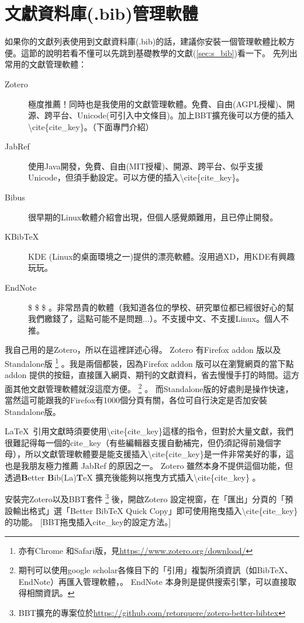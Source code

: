 \documentclass[class=NCU_thesis, crop=false, float=true]{standalone}
\begin{document}
\section{文獻資料庫(.bib)管理軟體}
如果你的文獻列表使用到文獻資料庫(.bib)的話，建議你安裝一個管理軟體比較方便。這節的說明若看不懂可以先跳到基礎教學的文獻(\cref{sec:s_bib})看一下。
先列出常用的文獻管理軟體：
\begin{description}
    \item[Zotero] 極度推薦！同時也是我使用的文獻管理軟體。免費、自由(AGPL授權)、開源、跨平台、Unicode(可引入中文條目)。加上BBT擴充後可以方便的插入\textbackslash{}cite\{cite\_key\}。（下面專門介紹）
    \item[JabRef] 使用Java開發，免費、自由(MIT授權)、開源、跨平台、似乎支援Unicode，但須手動設定。可以方便的插入\textbackslash{}cite\{cite\_key\}。
    \item[Bibus] 很早期的Linux軟體介紹會出現，但個人感覺頗難用，且已停止開發。
    \item[KBibTeX] KDE (Linux的桌面環境之一)提供的漂亮軟體。沒用過XD，用KDE有興趣玩玩。
    \item[EndNote] \$ \$ \$ 。非常昂貴的軟體（我知道各位的學校、研究單位都已經很好心的幫我們繳錢了，這點可能不是問題...）。不支援中文、不支援Linux。個人不推。
\end{description}
我自己用的是Zotero，所以在這裡詳述心得。
Zotero 有Firefox addon 版以及Standalone版
\footnote{亦有Chrome 和Safari版，見\url{https://www.zotero.org/download/}}
。我是兩個都裝，因為Firefox addon 版可以在瀏覽網頁的當下點addon 提供的按鈕，直接匯入網頁、期刊的文獻資料，省去慢慢手打的時間。這方面其他文獻管理軟體就沒這麼方便。
\footnote{期刊可以使用google scholar各條目下的「引用」複製所須資訊（如BibTeX、EndNote）再匯入管理軟體，。 EndNote 本身則是提供搜索引擎，可以直接取得相關資訊。}
。
而Standalone版的好處則是操作快速，當然這可能跟我的Firefox有1000個分頁有關，各位可自行決定是否加安裝Standalone版。

\LaTeX\  引用文獻時須要使用\textbackslash{}cite\{cite\_key\}這樣的指令，但對於大量文獻，我們很難記得每一個的cite\_key（有些編輯器支援自動補完，但仍須記得前幾個字母），所以文獻管理軟體要是能支援插入\textbackslash{}cite\{cite\_key\}是一件非常美好的事，這也是我朋友極力推薦 JabRef 的原因之一。 Zotero 雖然本身不提供這個功能，但透過\textbf{B}etter \textbf{B}ib(La)\textbf{T}eX 擴充後能夠以拖曳方式插入\textbackslash{}cite\{cite\_key\} 。

安裝完Zotero以及BBT套件
\footnote{BBT擴充的專案位於\url{https://github.com/retorquere/zotero-better-bibtex} }
後，開啟Zotero 設定視窗，在「匯出」分頁的「預設輸出格式」選「Better BibTeX Quick Copy」即可使用拖曳插入\textbackslash{}cite\{cite\_key\} 的功能。
[BBT拖曳插入cite\_key的設定方法。]
\end{document}

